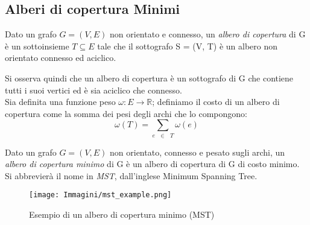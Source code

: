 \subsection{Alberi di copertura Minimi}\label{subsec:mst_description}
\begin{defn}
Dato un grafo $G = (V, E)$ non orientato e connesso, un \emph{albero di copertura} di G è un sottoinsieme $T \subseteq E$ tale che il sottografo S = (V, T) è un albero non orientato connesso ed aciclico.
\end{defn}
Si osserva quindi che un albero di copertura è un sottografo di G che contiene tutti i suoi vertici ed è sia aciclico che connesso.\\
Sia definita una funzione peso $\omega: E \rightarrow \mathbb{R}$; definiamo il costo di un albero di copertura come la somma dei pesi degli archi che lo compongono:
\begin{equation}
\omega(T) = \sum_{e \text{ } \in \text{ } T} \omega(e)
\end{equation}
\begin{defn}
	Dato un grafo $G = (V, E)$ non orientato, connesso e pesato sugli archi, un \emph{albero di copertura minimo} di G è un albero di copertura di G di costo minimo. Si abbrevierà il nome in \emph{MST}, dall’inglese Minimum Spanning Tree.
\end{defn}
\begin{figure}[H]
	\centering
	\texttt{[image: Immagini/mst\_example.png]}
	\caption{Esempio di un albero di copertura minimo (MST)}
	\label{fig:mst_simple}
\end{figure}

